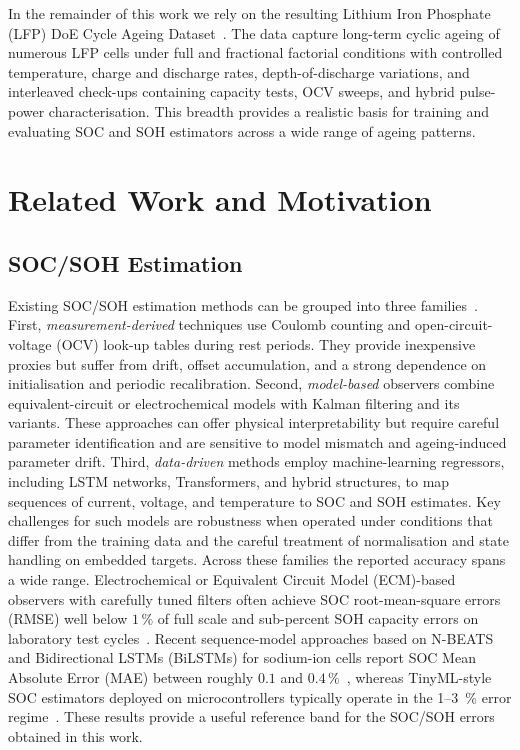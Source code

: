 \documentclass[final,3p,times]{elsarticle}
\begin{document}
In the remainder of this work we rely on the resulting Lithium Iron Phosphate (LFP) DoE Cycle Ageing Dataset~\cite{LFP_DoE_Cycle_Aging_Dataset}. The data capture long-term cyclic ageing of numerous LFP cells under full and fractional factorial conditions with controlled temperature, charge and discharge rates, depth-of-discharge variations, and interleaved check-ups containing capacity tests, OCV sweeps, and hybrid pulse-power characterisation. This breadth provides a realistic basis for training and evaluating SOC and SOH estimators across a wide range of ageing patterns.
\section{Related Work and Motivation}
\subsection{SOC/SOH Estimation}
Existing SOC/SOH estimation methods can be grouped into three families~\cite{a.m.s.m.h.s.attanayakaEstimationStateCharge2019,berecibarCriticalReviewState2016,shrivastavaReviewTechnologicalAdvancement2023,guoSystematicReviewElectrochemical2024}. First, \emph{measurement-derived} techniques use Coulomb counting and open-circuit-voltage (OCV) look-up tables during rest periods. They provide inexpensive proxies but suffer from drift, offset accumulation, and a strong dependence on initialisation and periodic recalibration. Second, \emph{model-based} observers combine equivalent-circuit or electrochemical models with Kalman filtering and its variants. These approaches can offer physical interpretability but require careful parameter identification and are sensitive to model mismatch and ageing-induced parameter drift. Third, \emph{data-driven} methods employ machine-learning regressors, including LSTM networks, Transformers, and hybrid structures, to map sequences of current, voltage, and temperature to SOC and SOH estimates. Key challenges for such models are robustness when operated under conditions that differ from the training data and the careful treatment of normalisation and state handling on embedded targets.
Across these families the reported accuracy spans a wide range. Electrochemical or Equivalent Circuit Model (ECM)-based observers with carefully tuned filters often achieve SOC root-mean-square errors (RMSE) well below $1\,\%$ of full scale and sub-percent SOH capacity errors on laboratory test cycles~\cite{gaoCoEstimationStateofChargeStateof2022,gaoEnhancedStateofchargeEstimation2022,shenAlternativeCombinedCoestimation2022,wangFusionEstimationLithiumion2022}. Recent sequence-model approaches based on N-BEATS and Bidirectional LSTMs (BiLSTMs) for sodium-ion cells report SOC Mean Absolute Error (MAE) between roughly $0.1$ and $0.4\,\%$~\cite{sunStateChargeEstimation2023,sunStateofchargeEstimationSodiumion2024}, whereas TinyML-style SOC estimators deployed on microcontrollers typically operate in the 1--3~\% error regime~\cite{crocioniLiIonBatteriesParameter2020,giazitzisCaseStudyTiny2024,Embedded_AI_only_SOC_mobile}. These results provide a useful reference band for the SOC/SOH errors obtained in this work.
\end{document}
